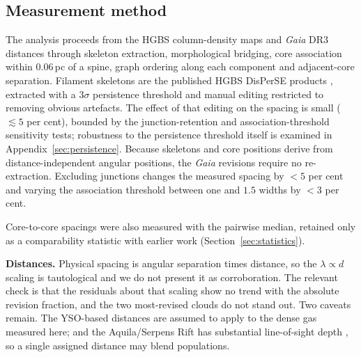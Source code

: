 \documentclass[usenatbib,twoside,twocolumn]{mnras}
\begin{document}
\subsection{Measurement method}
\label{sec:methodology}

The analysis proceeds from the HGBS column-density maps and \textit{Gaia} DR3 distances through skeleton extraction, morphological bridging, core association within $0.06$\,pc of a spine, graph ordering along each component and adjacent-core separation. Filament skeletons are the published HGBS DisPerSE products \citep{Sousbie2011,Arzoumanian2011}, extracted with a $3\sigma$ persistence threshold and manual editing restricted to removing obvious artefacts. The effect of that editing on the spacing is small ($\lesssim5$ per cent), bounded by the junction-retention and association-threshold sensitivity tests; robustness to the persistence threshold itself is examined in Appendix~\ref{sec:persistence}. Because skeletons and core positions derive from distance-independent angular positions, the \textit{Gaia} revisions require no re-extraction. Excluding junctions changes the measured spacing by $<5$ per cent and varying the association threshold between one and $1.5$ widths by $<3$ per cent.

Core-to-core spacings were also measured with the pairwise median, retained only as a comparability statistic with earlier work (Section~\ref{sec:statistics}).

\smallskip\noindent\textbf{Distances.} Physical spacing is angular separation times distance, so the $\lambda\propto d$ scaling is tautological and we do not present it as corroboration. The relevant check is that the residuals about that scaling show no trend with the absolute revision fraction, and the two most-revised clouds do not stand out. Two caveats remain. The YSO-based distances \citep{Zhang2023} are assumed to apply to the dense gas measured here; and the Aquila/Serpens Rift has substantial line-of-sight depth \citep{Zucker2020,Green2024}, so a single assigned distance may blend populations.
\end{document}
